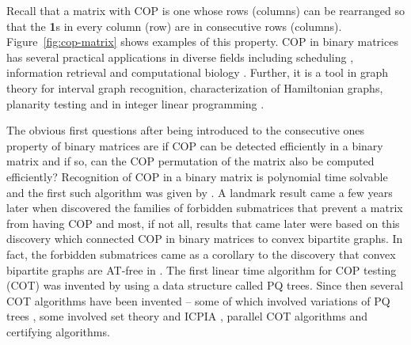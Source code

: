 \documentclass[MS,synopsis]{iitmdiss}
\def \un {\bf 1}
\begin{document}
Recall that a matrix with COP is one whose rows (columns)
can be rearranged so that the {\un}s in every column (row) are in
consecutive rows (columns). Figure~\ref{fig:cop-matrix} shows examples
of this property.
COP in binary matrices has several practical applications in diverse
fields including scheduling \cite{hl06}, information retrieval
\cite{k77} and computational biology \cite{abh98}.  Further, it is a
tool in graph theory \cite{mcg04} for interval graph recognition,
characterization of Hamiltonian graphs, planarity testing \cite{bl76}
and in integer linear programming \cite{ht02,hl06}.


The obvious first questions after being introduced to the consecutive
ones property of binary matrices are if COP can be detected
efficiently in a binary matrix and if so, can the COP permutation of
the matrix also be computed efficiently?  Recognition of COP in a
binary matrix is polynomial time solvable and the first such algorithm
was given by \cite{fg65}.  A landmark result came a few years later
when \cite{at72} discovered the families of forbidden submatrices that
prevent a matrix from having COP and most, if not all, results that
came later were based on this discovery which connected COP in binary
matrices to convex bipartite graphs. In fact, the forbidden
submatrices came as a corollary to the discovery that convex bipartite
graphs are AT-free in \cite{at72}. The first linear time
algorithm for COP testing (COT) was invented by \cite{bl76} using a
data structure called PQ trees.  Since then several COT algorithms
have been invented -- some of which involved variations of PQ trees
\cite{mm96,wlh01,mcc04}, some involved set theory and ICPIA
\cite{wlh02,nsnrs09}, parallel COT algorithms\cite{as95,bs03,ly91} and
certifying algorithms\cite{mcc04}. %
\end{document}
